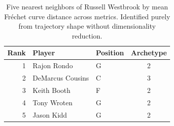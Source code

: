 \begin{table}[htbp]
  \centering\small
  \begin{tabular}{rllc}
    \toprule
    Rank & Player & Position & Archetype \\
    \midrule
    1 & Rajon Rondo & G & 2 \\
    2 & DeMarcus Cousins & C & 3 \\
    3 & Keith Booth & F & 2 \\
    4 & Tony Wroten & G & 2 \\
    5 & Jason Kidd & G & 2 \\
    \bottomrule
  \end{tabular}
  \caption{Five nearest neighbors of Russell Westbrook by mean Fr\'{e}chet curve distance across metrics. Identified purely from trajectory shape without dimensionality reduction.}
  \label{tab:Russell_Westbrook_frechet_curve_neighbors}
\end{table}

